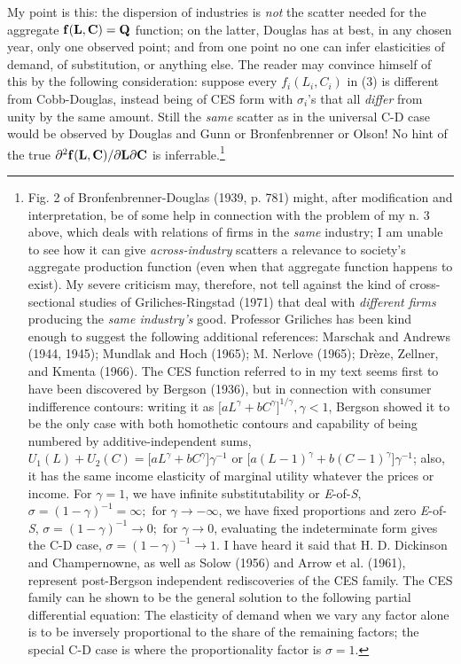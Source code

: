 \documentclass{article}
\begin{document}
My point is this: the dispersion of industries is \emph{not} the scatter needed for the aggregate \(\vb{f} (\vb{L},\vb{C})=\vb{Q}\) function; on the latter, Douglas has at best, in any chosen year, only one observed point; and from one point no one can infer elasticities of demand, of substitution, or anything else. The reader may convince himself of this by the following consideration: suppose every \(f_i (L_i,C_i)\) in (3) is different from Cobb-Douglas, instead being of CES form with \(\sigma_i\)'s that all \emph{differ} from unity by the same amount. Still the \emph{same} scatter as in the universal C-D case would be observed by Douglas and Gunn or Bronfenbrenner or Olson! No hint of the true \(\partial^2 \vb{f} (\vb{L},\vb{C})/\partial \vb{L} \partial \vb{C}\) is inferrable.\footnote{Fig. 2 of Bronfenbrenner-Douglas (1939, p. 781) might, after modification and interpretation, be of some help in connection with the problem of my n. 3 above, which deals with relations of firms in the \emph{same} industry; I am unable to see how it can give \emph{across-industry} scatters a relevance to society's aggregate production function (even when that aggregate function happens to exist). My severe criticism may, therefore, not tell against the kind of cross-sectional studies of Griliches-Ringstad (1971) that deal with \emph{different firms} producing the \emph{same industry's} good. Professor Griliches has been kind enough to suggest the following additional references: Marschak and Andrews (1944, 1945); Mundlak and Hoch (1965); M. Nerlove (1965); Dr\`eze, Zellner, and Kmenta (1966). The CES function referred to in my text seems first to have been discovered by Bergson (1936), but in connection with consumer indifference contours: writing it as \(\lbrack aL^\gamma+bC^\gamma \rbrack^{1/\gamma}, \gamma<1\), Bergson showed it to be the only case with both homothetic contours and capability of being numbered by additive-independent sums, \(U_1 (L)+U_2 (C)=\lbrack aL^\gamma+bC^\gamma \rbrack \gamma^{-1}\text{ or }\lbrack a(L-1)^\gamma+b(C-1)^\gamma \rbrack \gamma^{-1}\); also, it has the same income elasticity of marginal utility whatever the prices or income. For \(\gamma=1\), we have infinite substitutability or \emph{E}-of-\emph{S}, \(\sigma =(1-\gamma)^{-1}=\infty;\text{ for }\gamma \to -\infty\), we have fixed proportions and zero \emph{E}-of-\emph{S}, \(\sigma =(1-\gamma)^{-1} \to 0;\text{ for }\gamma \to 0\), evaluating the indeterminate form gives the C-D case, \(\sigma =(1-\gamma)^{-1} \to 1\). I have heard it said that H. D. Dickinson and Champernowne, as well as Solow (1956) and Arrow et al. (1961), represent post-Bergson independent rediscoveries of the CES family. The CES family can he shown to be the general solution to the following partial differential equation: The elasticity of demand when we vary any factor alone is to be inversely proportional to the share of the remaining factors; the special C-D case is where the proportionality factor is \(\sigma =1\).}
% 
\end{document}
